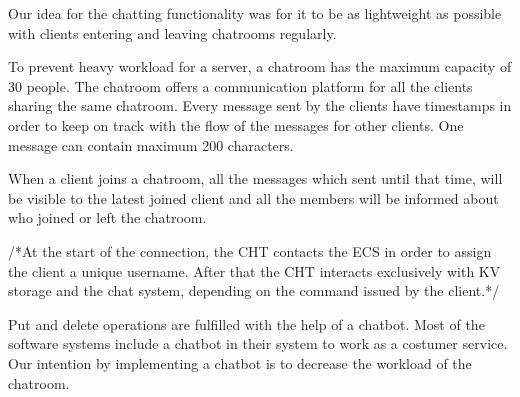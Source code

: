 Our idea for the chatting functionality was for it to be as lightweight as possible with clients entering and leaving chatrooms regularly.

To prevent heavy workload for a server, a chatroom has the maximum capacity of 30 people. The chatroom offers a communication platform for all the clients sharing the same chatroom. Every message sent by the clients have timestamps in order to keep on track with the flow of the messages for other clients. One message can contain maximum 200 characters.

When a client joins a chatroom, all the messages which sent until that time, will be visible to the latest joined client and all the members will be informed about who joined or left the chatroom. 


/*At the start of the connection, the CHT contacts the ECS in order to assign the client a unique username. After that the CHT interacts exclusively with KV storage and the chat system, depending on the command issued by the client.*/


Put and delete operations are fulfilled with the help of a chatbot. Most of the software systems include a chatbot in their system to work as a costumer service. Our intention by implementing a chatbot is to decrease the workload of the chatroom.